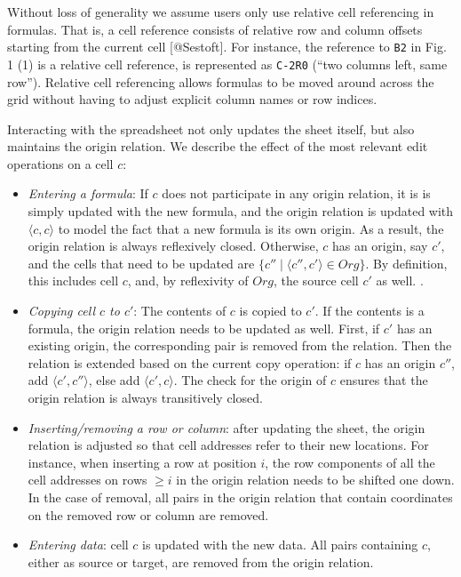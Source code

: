 \documentclass[11pt,]{article}
\begin{document}
Without loss of generality we assume users only use relative cell
referencing in formulas. That is, a cell reference consists of relative
row and column offsets starting from the current cell {[}@Sestoft{]}.
For instance, the reference to \texttt{B2} in Fig. 1 (1) is a relative
cell reference, is represented as \texttt{C-2R0} (``two columns left,
same row''). Relative cell referencing allows formulas to be moved
around across the grid without having to adjust explicit column names or
row indices.

Interacting with the spreadsheet not only updates the sheet itself, but
also maintains the origin relation. We describe the effect of the most
relevant edit operations on a cell \(c\):

\begin{itemize}
\item
  \emph{Entering a formula}: If \(c\) does not participate in any origin
  relation, it is is simply updated with the new formula, and the origin
  relation is updated with \(\langle c, c\rangle\) to model the fact
  that a new formula is its own origin. As a result, the origin relation
  is always reflexively closed. Otherwise, \(c\) has an origin, say
  \(c'\), and the cells that need to be updated are
  \(\{ c'' \;|\; \langle c'', c'\rangle \in Org \}\). By definition,
  this includes cell \(c\), and, by reflexivity of \(Org\), the source
  cell \(c'\) as well. .
\item
  \emph{Copying cell \(c\) to \(c'\)}: The contents of \(c\) is copied
  to \(c'\). If the contents is a formula, the origin relation needs to
  be updated as well. First, if \(c'\) has an existing origin, the
  corresponding pair is removed from the relation. Then the relation is
  extended based on the current copy operation: if \(c\) has an origin
  \(c''\), add \(\langle c', c''\rangle\), else add
  \(\langle c', c\rangle\). The check for the origin of \(c\) ensures
  that the origin relation is always transitively closed.
\item
  \emph{Inserting/removing a row or column}: after updating the sheet,
  the origin relation is adjusted so that cell addresses refer to their
  new locations. For instance, when inserting a row at position \(i\),
  the row components of all the cell addresses on rows \(\geq i\) in the
  origin relation needs to be shifted one down. In the case of removal,
  all pairs in the origin relation that contain coordinates on the
  removed row or column are removed.
\item
  \emph{Entering data}: cell \(c\) is updated with the new data. All
  pairs containing \(c\), either as source or target, are removed from
  the origin relation.
\end{itemize}
\end{document}

